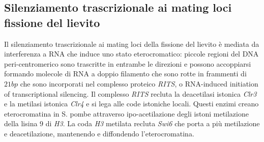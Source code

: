\subsection{Silenziamento trascrizionale ai mating loci fissione del lievito}
Il silenziamento trascrizionale ai mating loci della fissione del lievito \`e mediata da interferenza a RNA che induce uno stato eterocromatico: piccole regioni del DNA peri-centromerico
sono trascritte in entrambe le direzioni e possono accoppiarsi formando molecole di RNA a doppio filamento che sono rotte in frammenti di $21bp$ che sono incorporati nel complesso
proteico \emph{RITS}, o RNA-induced initiation of transcriptional silencing. Il complesso \emph{RITS} recluta la deacetilasi istonica \emph{Clr3} e la metilasi istonica \emph{Clr4} e
si lega alle code istoniche locali. Questi enzimi creano eterocromatina in S. pombe attraverso ipo-acetilazione degli istoni metilazione della lisina $9$ di \emph{H3}. La coda \emph{H3}
metilata recluta \emph{Swi6} che porta a pi\`u metilazione e deacetilazione, mantenendo e diffondendo l'eterocromatina. 

